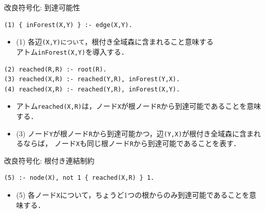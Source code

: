 \documentclass[dvipdfmx,11pt]{beamer}
\newcommand{\code}[1]{\lstinline[basicstyle=\ttfamily]{#1}}
\begin{document}
\begin{frame}[fragile]{改良符号化: 到達可能性}
\begin{exampleblock}{}\small
\begin{lstlisting}
(1) { inForest(X,Y) } :- edge(X,Y).
\end{lstlisting}
\end{exampleblock}
\begin{itemize}
 \item (1) 各辺\code{(X,Y)について}，根付き全域森に含まれること意味する \\
	  アトム\code{inForest(X,Y)}を導入する．
\end{itemize}
\begin{exampleblock}{}\small
\begin{lstlisting}
(2) reached(R,R) :- root(R).
(3) reached(X,R) :- reached(Y,R), inForest(Y,X).
(4) reached(X,R) :- reached(Y,R), inForest(X,Y).
\end{lstlisting}
\end{exampleblock}
\vfill
\begin{itemize}
\item アトム\code{reached(X,R)}は，ノード\code{X}が根ノード\code{R}から到達可能であることを意味する．
\item (3) ノード\code{Y}が根ノード\code{R}から到達可能かつ，辺\code{(Y,X)}が根付き全域森に含まれるならば，
	  ノード\code{X}も同じ根ノード\code{R}から到達可能であることを表す．
\end{itemize}
\end{frame}
\begin{frame}[fragile]{改良符号化: 根付き連結制約}
\begin{exampleblock}{}\small
\begin{lstlisting}
(5) :- node(X), not 1 { reached(X,R) } 1.
\end{lstlisting}
\end{exampleblock}
\vfill
\begin{itemize}
\item (5) 各ノード\code{X}について，ちょうど1つの根からのみ到達可能であることを意味する．
\end{itemize}
\end{frame}
\end{document}
